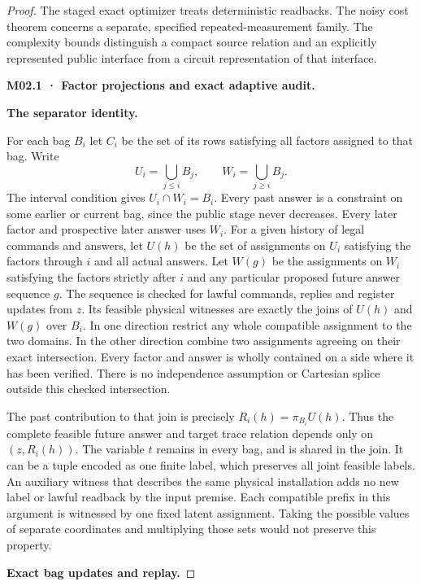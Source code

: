 \begin{proof}

The staged exact optimizer treats deterministic readbacks. The noisy cost theorem concerns a separate, specified repeated-measurement family. The complexity bounds distinguish a compact source relation and an explicitly represented public interface from a circuit representation of that interface.

\textbf{M02.1 · Factor projections and exact adaptive audit.}

\textbf{The separator identity.}

For each bag \(B_i\) let \(C_i\) be the set of its rows satisfying all factors assigned to that bag. Write
\[
 U_i=\bigcup_{j\le i}B_j,\qquad W_i=\bigcup_{j\ge i}B_j.
\]
The interval condition gives \(U_i\cap W_i=B_i\). Every past answer is a constraint on some earlier or current bag, since the public stage never decreases. Every later factor and prospective later answer uses \(W_i\). For a given history of legal commands and answers, let \(U(h)\) be the set of assignments on \(U_i\) satisfying the factors through \(i\) and all actual answers. Let \(W(g)\) be the assignments on \(W_i\) satisfying the factors strictly after \(i\) and any particular proposed future answer sequence \(g\). The sequence is checked for lawful commands, replies and register updates from \(z\). Its feasible physical witnesses are exactly the joins of \(U(h)\) and \(W(g)\) over \(B_i\). In one direction restrict any whole compatible assignment to the two domains. In the other direction combine two assignments agreeing on their exact intersection. Every factor and answer is wholly contained on a side where it has been verified. There is no independence assumption or Cartesian splice outside this checked intersection.

The past contribution to that join is precisely \(R_i(h)=\pi_{B_i} U(h)\). Thus the complete feasible future answer and target trace relation depends only on \((z,R_i(h))\). The variable \(t\) remains in every bag, and is shared in the join. It can be a tuple encoded as one finite label, which preserves all joint feasible labels. An auxiliary witness that describes the same physical installation adds no new label or lawful readback by the input premise. Each compatible prefix in this argument is witnessed by one fixed latent assignment. Taking the possible values of separate coordinates and multiplying those sets would not preserve this property.

\textbf{Exact bag updates and replay.}


\end{proof}
